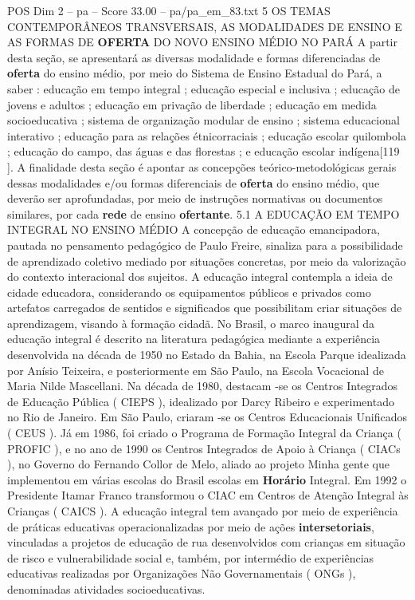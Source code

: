 \begin{textsample}{POS Dim 2 – pa – Score 33.00 – pa/pa\_em\_83.txt}  \label{ex:f2_pos_062}
5 OS TEMAS CONTEMPORÂNEOS TRANSVERSAIS, AS MODALIDADES DE ENSINO E AS FORMAS DE \textbf{OFERTA} DO NOVO ENSINO MÉDIO NO PARÁ A partir desta seção, se apresentará as diversas modalidade e formas diferenciadas de \textbf{oferta} do ensino médio, por meio do Sistema de Ensino Estadual do Pará, a saber : educação em tempo integral ; educação especial e inclusiva ; educação de jovens e adultos ; educação em privação de liberdade ; educação em medida socioeducativa ; sistema de organização modular de ensino ; sistema educacional interativo ; educação para as relações étnicorraciais ; educação escolar quilombola ; educação do campo, das águas e das florestas ; e educação escolar indígena[119 ].
A finalidade desta seção é apontar as concepções teórico-metodológicas gerais dessas modalidades e/ou formas diferenciais de \textbf{oferta} do ensino médio, que deverão ser aprofundadas, por meio de instruções normativas ou documentos similares, por cada \textbf{rede} de ensino \textbf{ofertante}. 5.1 A EDUCAÇÃO EM TEMPO INTEGRAL NO ENSINO MÉDIO A concepção de educação emancipadora, pautada no pensamento pedagógico de Paulo Freire, sinaliza para a possibilidade de aprendizado coletivo mediado por situações concretas, por meio da valorização do contexto interacional dos sujeitos.
A educação integral contempla a ideia de cidade educadora, considerando os equipamentos públicos e privados como artefatos carregados de sentidos e significados que possibilitam criar situações de aprendizagem, visando à formação cidadã.
No Brasil, o marco inaugural da educação integral é descrito na literatura pedagógica mediante a experiência desenvolvida na década de 1950 no Estado da Bahia, na Escola Parque idealizada por Anísio Teixeira, e posteriormente em São Paulo, na Escola Vocacional de Maria Nilde Mascellani.
Na década de 1980, destacam -se os Centros Integrados de Educação Pública ( CIEPS ), idealizado por Darcy Ribeiro e experimentado no Rio de Janeiro.
Em São Paulo, criaram -se os Centros Educacionais Unificados ( CEUS ).
Já em 1986, foi criado o Programa de Formação Integral da Criança ( PROFIC ), e no ano de 1990 os Centros Integrados de Apoio à Criança ( CIACs ), no Governo do Fernando Collor de Melo, aliado ao projeto Minha gente que implementou em várias escolas do Brasil escolas em \textbf{Horário} Integral.
Em 1992 o Presidente Itamar Franco transformou o CIAC em Centros de Atenção Integral às Crianças ( CAICS ).
A educação integral tem avançado por meio de experiência de práticas educativas operacionalizadas por meio de ações \textbf{intersetoriais}, vinculadas a projetos de educação de rua desenvolvidos com crianças em situação de risco e vulnerabilidade social e, também, por intermédio de experiências educativas realizadas por Organizações Não Governamentais ( ONGs ), denominadas atividades socioeducativas.

\end{textsample}
